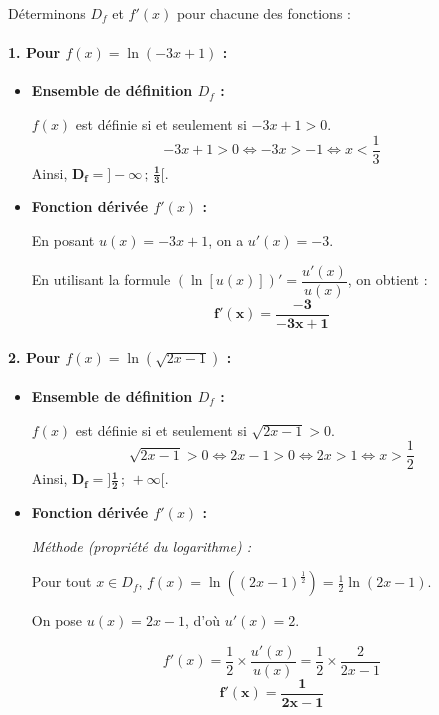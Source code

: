 \documentclass[12pt,a4paper]{article}
\begin{document}
\begin{tcolorbox}[colback=gray!5!white,colframe=myblue,title=\textbf{Correction de l'Exemple 3}]

Déterminons $D_f$ et $f'(x)$ pour chacune des fonctions :

\paragraph{1. Pour $f(x) = \ln(-3x + 1)$ :}
\begin{itemize}
    \item \textbf{Ensemble de définition $D_f$ :}
    
    $f(x)$ est définie si et seulement si $-3x + 1 > 0$.
    $$ -3x + 1 > 0 \iff -3x > -1 \iff x < \frac{1}{3} $$
    Ainsi, $\mathbf{D_f = \Big]-\infty \,;\, \frac{1}{3}\Big[}$.

    \item \textbf{Fonction dérivée $f'(x)$ :}
    
    En posant $u(x) = -3x + 1$, on a $u'(x) = -3$.
    
    En utilisant la formule $\left(\ln[u(x)]\right)' = \dfrac{u'(x)}{u(x)}$, on obtient :
    $$\mathbf{f'(x) = \frac{-3}{-3x + 1}}$$
\end{itemize}

\vspace{0.4cm}

\paragraph{2. Pour $f(x) = \ln(\sqrt{2x - 1})$ :}
\begin{itemize}
    \item \textbf{Ensemble de définition $D_f$ :}
    
    $f(x)$ est définie si et seulement si $\sqrt{2x - 1} > 0$.
    $$\sqrt{2x - 1} > 0 \iff 2x - 1 > 0 \iff 2x > 1 \iff x > \frac{1}{2}$$
    Ainsi, $\mathbf{D_f = \Big]\frac{1}{2} \,;\, +\infty\Big[}$.

    \item \textbf{Fonction dérivée $f'(x)$ :}
    
    \textit{Méthode (propriété du logarithme) :}
    
    Pour tout $x \in D_f$, $f(x) = \ln\left((2x - 1)^{\frac{1}{2}}\right) = \frac{1}{2}\ln(2x - 1)$.
    
    On pose $u(x) = 2x - 1$, d'où $u'(x) = 2$.
    
    $$f'(x) = \frac{1}{2} \times \frac{u'(x)}{u(x)} = \frac{1}{2} \times \frac{2}{2x - 1}$$
    $$\mathbf{f'(x) = \frac{1}{2x - 1}}$$
\end{itemize}

\end{tcolorbox}
\end{document}
